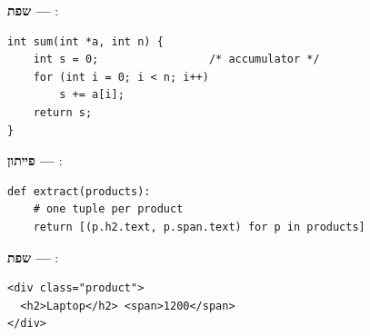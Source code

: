 \noindent\textbf{שפת  — }:
\begin{asmblock}
\begin{lstlisting}[style=cstyle]
int sum(int *a, int n) {
    int s = 0;                 /* accumulator */
    for (int i = 0; i < n; i++)
        s += a[i];
    return s;
}
\end{lstlisting}
\end{asmblock}

\noindent\textbf{פייתון — }:
\begin{asmblock}
\begin{lstlisting}[style=pystyle]
def extract(products):
    # one tuple per product
    return [(p.h2.text, p.span.text) for p in products]
\end{lstlisting}
\end{asmblock}

\noindent\textbf{שפת  — }:
\begin{asmblock}
\begin{lstlisting}[style=htmlstyle]
<div class="product">
  <h2>Laptop</h2> <span>1200</span>
</div>
\end{lstlisting}
\end{asmblock}


